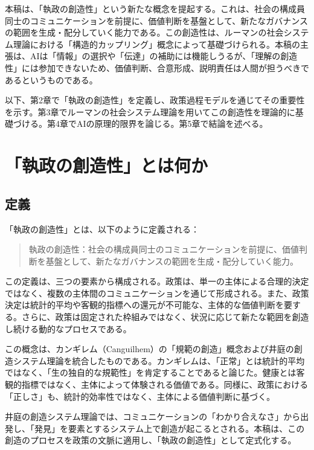 \documentclass{keikaku}
\begin{document}
本稿は、「執政の創造性」という新たな概念を提起する。これは、社会の構成員同士のコミュニケーションを前提に、価値判断を基盤として、新たなガバナンスの範囲を生成・配分していく能力である。この創造性は、ルーマンの社会システム理論における「構造的カップリング」概念によって基礎づけられる。本稿の主張は、AIは「情報」の選択や「伝達」の補助には機能しうるが、「理解の創造性」には参加できないため、価値判断、合意形成、説明責任は人間が担うべきであるというものである。

以下、第2章で「執政の創造性」を定義し、政策過程モデルを通じてその重要性を示す。第3章でルーマンの社会システム理論を用いてこの創造性を理論的に基礎づける。第4章でAIの原理的限界を論じる。第5章で結論を述べる。

\section{「執政の創造性」とは何か}

\subsection{定義}

「執政の創造性」とは、以下のように定義される：

\begin{quote}
執政の創造性：社会の構成員同士のコミュニケーションを前提に、価値判断を基盤として、新たなガバナンスの範囲を生成・配分していく能力。
\end{quote}

この定義は、三つの要素から構成される。政策は、単一の主体による合理的決定ではなく、複数の主体間のコミュニケーションを通じて形成される。また、政策決定は統計的平均や客観的指標への還元が不可能な、主体的な価値判断を要する。さらに、政策は固定された枠組みではなく、状況に応じて新たな範囲を創造し続ける動的なプロセスである。

この概念は、カンギレム（Canguilhem）の「規範の創造」概念\cite{canguilhem1966}および井庭の創造システム理論\cite{iba2009}を統合したものである。カンギレムは、「正常」とは統計的平均ではなく、「生の独自的な規範性」を肯定することであると論じた。健康とは客観的指標ではなく、主体によって体験される価値である。同様に、政策における「正しさ」も、統計的効率性ではなく、主体による価値判断に基づく。

井庭の創造システム理論では、コミュニケーションの「わかり合えなさ」から出発し、「発見」を要素とするシステム上で創造が起こるとされる。本稿は、この創造のプロセスを政策の文脈に適用し、「執政の創造性」として定式化する。
\end{document}
